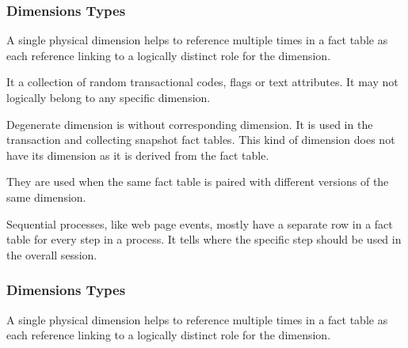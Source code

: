 \begin{frame}
\frametitle{Dimensions Types}
\begin{description}[<+->]
	\item[Role-Playing Dimensions]	A single physical dimension helps to reference multiple times in a fact table as each reference linking to a logically distinct role for the dimension.
	\item[Junk Dimensions]	It a collection of random transactional codes, flags or text attributes. It may not logically belong to any specific dimension.
	\item[Degenerate Dimensions]	Degenerate dimension is without corresponding dimension. It is used in the transaction and collecting snapshot fact tables. This kind of dimension does not have its dimension as it is derived from the fact table.
	\item[Swappable Dimensions]	They are used when the same fact table is paired with different versions of the same dimension.
	\item[Step Dimensions]	Sequential processes, like web page events, mostly have a separate row in a fact table for every step in a process. It tells where the specific step should be used in the overall session.

\end{description}
\end{frame}

\begin{frame}
\frametitle{Dimensions Types}
\begin{description}[<+->]
	\item[Slowly changing Dimensions]	A single physical dimension helps to reference multiple times in a fact table as each reference linking to a logically distinct role for the dimension.
	
\end{description}
\end{frame}

